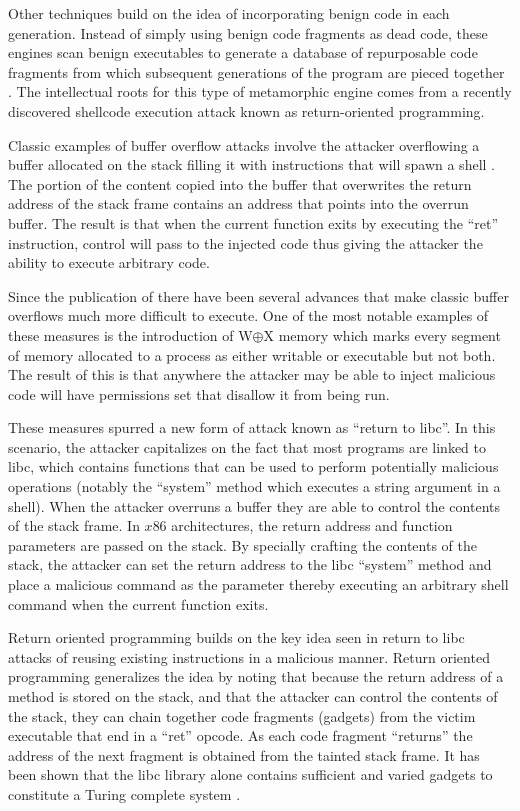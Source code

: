     Other techniques build on the idea of incorporating benign code in each
    generation. Instead of simply using benign code fragments as dead code,
    these engines scan benign executables to generate a database of repurposable
    code fragments from which subsequent generations of the program are pieced
    together \cite{franken}. The intellectual roots for this type of metamorphic
    engine comes from a recently discovered shellcode execution attack known as
    return-oriented programming.

    Classic examples of buffer overflow attacks involve the attacker overflowing
    a buffer allocated on the stack filling it with instructions that will spawn
    a shell \cite{aleph}. The portion of the content copied into the buffer that
    overwrites the return address of the stack frame contains an address that
    points into the overrun buffer. The result is that when the current function
    exits by executing the ``ret'' instruction, control will pass to the
    injected code thus giving the attacker the ability to execute arbitrary
    code.

    Since the publication of \cite{aleph} there have been several advances that
    make classic buffer overflows much more difficult to execute. One of the
    most notable examples of these measures is the introduction of W$\oplus$X
    memory which marks every segment of memory allocated to a process as either
    writable or executable but not both. The result of this is that anywhere the
    attacker may be able to inject malicious code will have permissions set that
    disallow it from being run.

    These measures spurred a new form of attack known as ``return to libc''. In
    this scenario, the attacker capitalizes on the fact that most programs are
    linked to libc, which contains functions that can be used to perform
    potentially malicious operations (notably the ``system'' method which
    executes a string argument in a shell). When the attacker overruns a buffer
    they are able to control the contents of the stack frame. In $x86$
    architectures, the return address and function parameters are passed on the
    stack. By specially crafting the contents of the stack, the attacker can set
    the return address to the libc ``system'' method and place a malicious
    command as the parameter thereby executing an arbitrary shell command when
    the current function exits.

    Return oriented programming builds on the key idea seen in return to libc
    attacks of reusing existing instructions in a malicious manner. Return
    oriented programming generalizes the idea by noting that because the return
    address of a method is stored on the stack, and that the attacker can
    control the contents of the stack, they can chain together code fragments
    (gadgets) from the victim executable that end in a ``ret'' opcode. As each
    code fragment ``returns'' the address of the next fragment is obtained from
    the tainted stack frame. It has been shown that the libc library alone
    contains sufficient and varied gadgets to constitute a Turing complete
    system \cite{rop_geo}.


